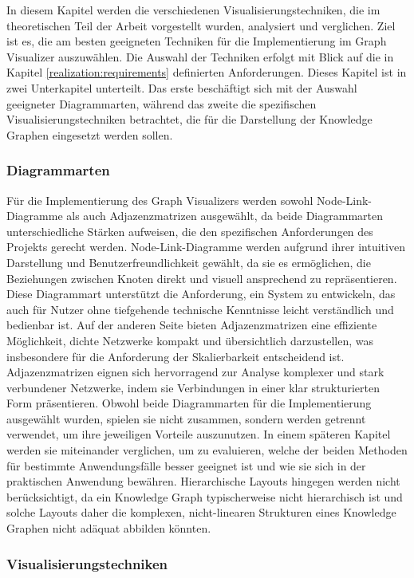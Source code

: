 In diesem Kapitel werden die verschiedenen Visualisierungstechniken, die im theoretischen Teil der Arbeit vorgestellt wurden, analysiert und verglichen. Ziel ist es, die am besten geeigneten Techniken für die Implementierung im Graph Visualizer auszuwählen. Die Auswahl der Techniken erfolgt mit Blick auf die in Kapitel \ref{realization:requirements} definierten Anforderungen. Dieses Kapitel ist in zwei Unterkapitel unterteilt. Das erste beschäftigt sich mit der Auswahl geeigneter Diagrammarten, während das zweite die spezifischen Visualisierungstechniken betrachtet, die für die Darstellung der Knowledge Graphen eingesetzt werden sollen.

\subsubsection{Diagrammarten}

Für die Implementierung des Graph Visualizers werden sowohl Node-Link-Diagramme als auch Adjazenzmatrizen ausgewählt, da beide Diagrammarten unterschiedliche Stärken aufweisen, die den spezifischen Anforderungen des Projekts gerecht werden. Node-Link-Diagramme werden aufgrund ihrer intuitiven Darstellung und Benutzerfreundlichkeit gewählt, da sie es ermöglichen, die Beziehungen zwischen Knoten direkt und visuell ansprechend zu repräsentieren. Diese Diagrammart unterstützt die Anforderung, ein System zu entwickeln, das auch für Nutzer ohne tiefgehende technische Kenntnisse leicht verständlich und bedienbar ist. Auf der anderen Seite bieten Adjazenzmatrizen eine effiziente Möglichkeit, dichte Netzwerke kompakt und übersichtlich darzustellen, was insbesondere für die Anforderung der Skalierbarkeit entscheidend ist. Adjazenzmatrizen eignen sich hervorragend zur Analyse komplexer und stark verbundener Netzwerke, indem sie Verbindungen in einer klar strukturierten Form präsentieren. Obwohl beide Diagrammarten für die Implementierung ausgewählt wurden, spielen sie nicht zusammen, sondern werden getrennt verwendet, um ihre jeweiligen Vorteile auszunutzen. In einem späteren Kapitel werden sie miteinander verglichen, um zu evaluieren, welche der beiden Methoden für bestimmte Anwendungsfälle besser geeignet ist und wie sie sich in der praktischen Anwendung bewähren. Hierarchische Layouts hingegen werden nicht berücksichtigt, da ein Knowledge Graph typischerweise nicht hierarchisch ist und solche Layouts daher die komplexen, nicht-linearen Strukturen eines Knowledge Graphen nicht adäquat abbilden könnten.

\subsubsection{Visualisierungstechniken}

